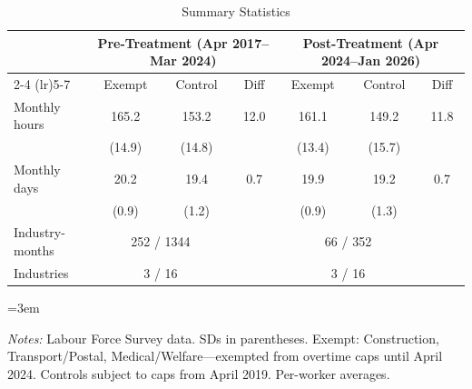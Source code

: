 \begin{table}[H]
\centering
\caption{Summary Statistics}
\label{tab:summary}
\begin{threeparttable}
\small
\begin{tabular}{lcccccc}
\toprule
& \multicolumn{3}{c}{Pre-Treatment (Apr 2017--Mar 2024)} & \multicolumn{3}{c}{Post-Treatment (Apr 2024--Jan 2026)} \\
\cmidrule(lr){2-4} \cmidrule(lr){5-7}
& Exempt & Control & Diff & Exempt & Control & Diff \\
\midrule
Monthly hours & 165.2 & 153.2 & 12.0 & 161.1 & 149.2 & 11.8 \\
& (14.9) & (14.8) & & (13.4) & (15.7) & \\
Monthly days & 20.2 & 19.4 & 0.7 & 19.9 & 19.2 & 0.7 \\
& (0.9) & (1.2) & & (0.9) & (1.3) & \\
\midrule
Industry-months & \multicolumn{2}{c}{252 / 1344} & & \multicolumn{2}{c}{66 / 352} \\
Industries & \multicolumn{2}{c}{3 / 16} & & \multicolumn{2}{c}{3 / 16} \\
\bottomrule
\end{tabular}
\begin{tablenotes}[flushleft]
\small\emergencystretch=3em
\item \textit{Notes:} Labour Force Survey data. SDs in parentheses. Exempt: Construction, Transport/Postal, Medical/Welfare---exempted from overtime caps until April 2024. Controls subject to caps from April 2019. Per-worker averages.
\end{tablenotes}
\end{threeparttable}
\end{table}
